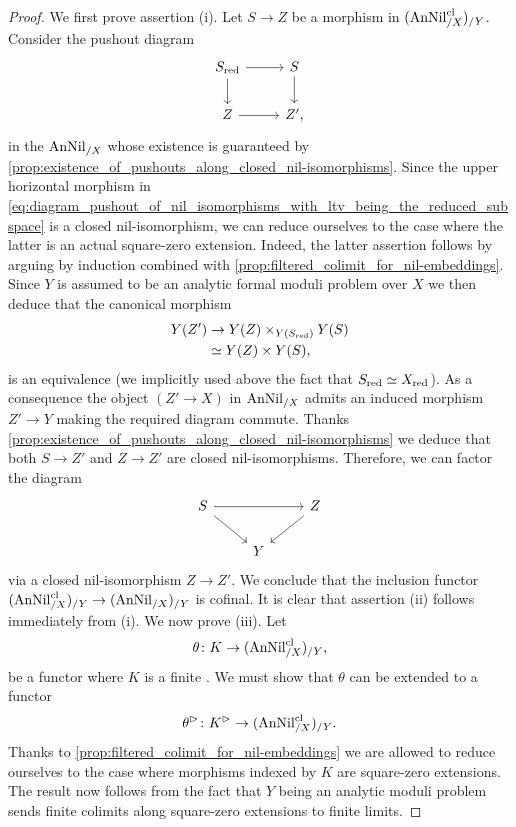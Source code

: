 \documentclass[10pt,a4paper,reqno]{amsart} %
\theoremstyle{plain}
\theoremstyle{definition}
\theoremstyle{remark}
\numberwithin{equation}{section}
\begin{document}
\begin{proof}
    We first prove assertion (i). Let $S \to Z$ be a morphism in $(\mathrm{AnNil}^{\mathrm{cl}}_{/X})_{/Y}$. Consider the pushout diagram
        \begin{equation} \label{eq:diagram_pushout_of_nil_isomorphisms_with_ltv_being_the_reduced_subspace}
        \begin{tikzcd}
            S_\red \ar{r} \ar{d} & S \ar{d} \\
            Z \ar{r} & Z',
        \end{tikzcd}
        \end{equation}
    in the \infcat $\mathrm{AnNil}_{/X}$ whose existence is guaranteed by \cref{prop:existence_of_pushouts_along_closed_nil-isomorphisms}. Since
    the upper horizontal morphism in \eqref{eq:diagram_pushout_of_nil_isomorphisms_with_ltv_being_the_reduced_subspace} is a closed nil-isomorphism, we can reduce
    ourselves to the case where the latter is an actual square-zero extension. Indeed, the latter assertion follows by
    arguing by induction combined with \cref{prop:filtered_colimit_for_nil-embeddings}.
    Since $Y$ is assumed to be an analytic formal moduli problem over $X$ we then deduce that the canonical morphism
        \begin{align*}
            Y(Z') & \to Y(Z) \times_{Y(S_{\mathrm{red}})} Y(S) \\
            &\simeq Y(Z) \times Y(S),  
        \end{align*}
    is an equivalence (we implicitly used above the fact that $S_{\mathrm{red}} \simeq X_{\mathrm{red}}$). As a consequence the object $(Z' \to X)$ in $\mathrm{AnNil}_{/X}$ admits an induced morphism
    $Z' \to Y$ making the required diagram commute.
    Thanks \cref{prop:existence_of_pushouts_along_closed_nil-isomorphisms} we deduce that both
    $S \to Z'$ and $Z \to Z'$ are closed nil-isomorphisms. Therefore, we can factor the diagram
        \[
        \begin{tikzcd}
            S \ar{rr} \ar{rd} & & Z \ar{dl} \\
                &               Y       &  
        \end{tikzcd}
        \]
    via a closed nil-isomorphism $Z \to Z'$. We conclude that the inclusion functor $(\mathrm{AnNil}^{\mathrm{cl}}_{/X})_{/Y} \to (\mathrm{AnNil}_{/X})_{/Y}$ is cofinal.
    It is clear that assertion (ii) follows immediately from (i). We now prove (iii). Let 
        \[\theta \colon K \to (\mathrm{AnNil}^{\mathrm{cl}}_{/X})_{/Y},\]
    be a functor where
    $K$ is a finite \infcat. We must show that $\theta$ can be extended to a functor
        \[\theta^{\rhd} \colon K^{\rhd} \to (\mathrm{AnNil}^{\mathrm{cl}}_{/X})_{/Y}.\]
    Thanks to \cref{prop:filtered_colimit_for_nil-embeddings} we are allowed to reduce ourselves to the case where morphisms indexed by $K$
    are square-zero extensions. The result now follows from the fact that $Y$ being an analytic moduli problem sends finite colimits along square-zero extensions
    to finite limits.
\end{proof}
\end{document}
